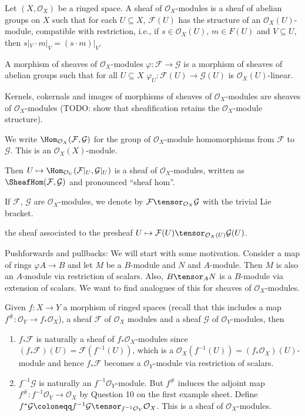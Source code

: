 Let $(X, \mathcal{O}_X)$ be a ringed space. A sheaf of  $\mathcal{O}_X$-modules
is a sheaf of abelian groups on $X$ such that for each $U \subseteq X$, $\mathcal{F}(U)$
has the structure of an $\mathcal{O}_X(U)$-module, compatible with restriction,
i.e., if $s \in \mathcal{O}_X(U)$, $m \in F(U)$ and $V \subseteq U$, then
$s|_V\cdot m|_V = (s\cdot m)|_V$.

A morphism of sheaves of $\mathcal{O}_X$-modules $\varphi\colon \mathcal{F}\to \mathcal{G}$
is a morphism of sheaves of abelian groups such that for all $U \subseteq X$
$\varphi_U\colon \mathcal{F}(U)\to \mathcal{G}(U)$ is $\mathcal{O}_X(U)$-linear.

Kernels, cokernals and images of morphisms of sheaves of $\mathcal{O}_X$-modules
are sheaves of $\mathcal{O}_X$-modules (TODO: show that sheafification retains the
$\mathcal{O}_X$-module structure).

We write $\Hom_{\mathcal{O}_X}(\mathcal{F}, \mathcal{G})$ for the group of
$\mathcal{O}_X$-module homomorphisms from $\mathcal{F}$ to $\mathcal{G}$.
This is an $\mathcal{O}_X(X)$-module.

Then $U\mapsto \Hom_{\mathcal{O}_U}(\mathcal{F}|_U, \mathcal{G}|_U)$ is a sheaf
of $\mathcal{O}_X$-modules, written as $\SheafHom(\mathcal{F}, \mathcal{G})$
and pronounced \enquote{sheaf hom}.

If $\mathcal{F}$, $\mathcal{G}$ are $\mathcal{O}_X$-modules, we denote by
$\mathcal{F}\tensor_{\mathcal{O}_X} \mathcal{G}$ with the trivial Lie bracket.

the sheaf associated to the
presheaf $U\mapsto \mathcal{F}(U) \tensor_{\mathcal{O}_X(U)} \mathcal{G}(U)$.

Pushforwards and pullbacks: We will start with some motivation.
Consider a map of rings $\varphi A\to B$ and let $M$ be a
$B$-module and $N$ and $A$-module. Then $M$ is also an $A$-module via restriction
of scalars. Also, $B\tensor_A N$ is a $B$-module via extension of scalars. We
want to find analogues of this for sheaves of $\mathcal{O}_X$-modules.

Given $f\colon X\to Y$ a morphism of ringed spaces (recall that this includes
a map $f^\#\colon \mathcal{O}_Y \to f_*\mathcal{O}_X$), a sheaf $\mathcal{F}$ of
$\mathcal{O}_X$ modules and a sheaf $\mathcal{G}$ of $\mathcal{O}_Y$-modules,
then
\begin{enumerate}
	\item $f_*\mathcal{F}$ is naturally a sheaf of $f_*\mathcal{O}_X$-modules since
		$(f_*\mathcal{F})(U)  = \mathcal{F}(f^{-1}(U))$, which is a
		 $\mathcal{O}_X(f^{-1}(U)) = (f_*\mathcal{O}_X)(U)$-module and hence
		 $f_*\mathcal{F}$ becomes a $\mathcal{O}_Y$-module via restriction of
		 scalars.
	\item $f^{-1}\mathcal{G}$ is naturally an $f^{-1}\mathcal{O}_Y$-module. But
		$f^\#$ induces the adjoint map $f^\#\colon f^{-1}\mathcal{O}_Y\to \mathcal{O}_X$
		by Question 10 on the first example sheet.
		Define $f^*\mathcal{G}\coloneqq f^{-1}\mathcal{G}\tensor_{f^{-1}\mathcal{O}_Y}\mathcal{O}_X$.
		This is a sheaf of $\mathcal{O}_X$-modules.
\end{enumerate}
